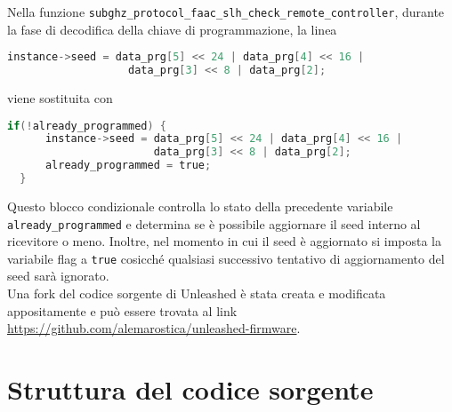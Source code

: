 Nella funzione \texttt{subghz\_protocol\_faac\_slh\_check\_remote\_controller}, durante la fase di decodifica della chiave di programmazione, la linea
\begin{lstlisting}[language=C]
  instance->seed = data_prg[5] << 24 | data_prg[4] << 16 |
                   data_prg[3] << 8 | data_prg[2];
\end{lstlisting}
viene sostituita con
\begin{lstlisting}[language=C]
  if(!already_programmed) {
      instance->seed = data_prg[5] << 24 | data_prg[4] << 16 |
                       data_prg[3] << 8 | data_prg[2];
      already_programmed = true;
  }
\end{lstlisting}
Questo blocco condizionale controlla lo stato della precedente variabile \texttt{already\_programmed} e determina se è possibile aggiornare il seed interno al ricevitore o meno. Inoltre, nel momento in cui il seed è aggiornato si imposta la variabile flag a \texttt{true} cosicché qualsiasi successivo tentativo di aggiornamento del seed sarà ignorato.\\
Una fork del codice sorgente di Unleashed è stata creata e modificata appositamente e può essere trovata al link \url{https://github.com/alemarostica/unleashed-firmware}.

\section{Struttura del codice sorgente}
\label{sec:source}


